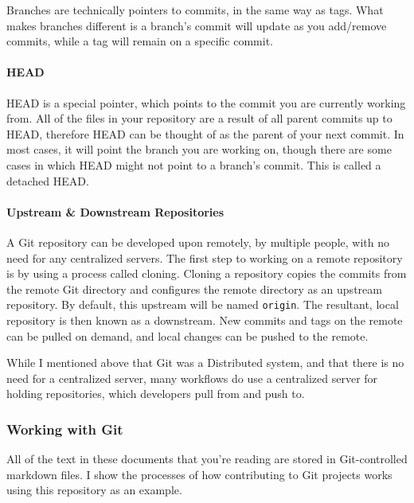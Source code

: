 Branches are technically pointers to commits, in the same way as tags. What makes branches different is a branch's commit will update as you add/remove commits, while a tag will remain on a specific commit.

\hypertarget{head}{%
\paragraph{HEAD}\label{head}}

HEAD is a special pointer, which points to the commit you are currently working from. All of the files in your repository are a result of all parent commits up to HEAD, therefore HEAD can be thought of as the parent of your next commit. In most cases, it will point the branch you are working on, though there are some cases in which HEAD might not point to a branch's commit. This is called a detached HEAD.

\hypertarget{upstream-downstream-repositories}{%
\paragraph{Upstream \& Downstream Repositories}\label{upstream-downstream-repositories}}

A Git repository can be developed upon remotely, by multiple people, with no need for any centralized servers. The first step to working on a remote repository is by using a process called cloning. Cloning a repository copies the commits from the remote Git directory and configures the remote directory as an upstream repository. By default, this upstream will be named \texttt{origin}. The resultant, local repository is then known as a downstream. New commits and tags on the remote can be pulled on demand, and local changes can be pushed to the remote.

While I mentioned above that Git was a Distributed system, and that there is no need for a centralized server, many workflows do use a centralized server for holding repositories, which developers pull from and push to.

\hypertarget{working-with-git}{%
\subsubsection{Working with Git}\label{working-with-git}}

All of the text in these documents that you're reading are stored in Git-controlled markdown files. I show the processes of how contributing to Git projects works using this repository as an example.

